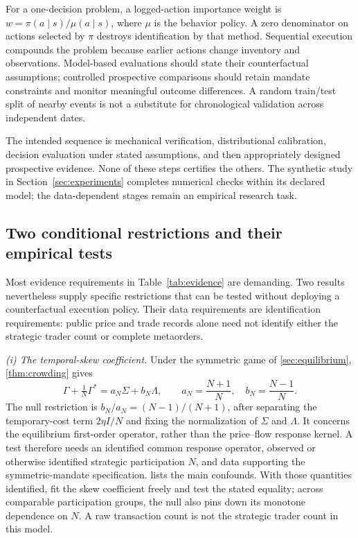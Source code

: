 \documentclass[11pt]{article}
\numberwithin{equation}{section}
\theoremstyle{definition}
\theoremstyle{remark}
\theoremstyle{definition}
\begin{document}
For a one-decision problem, a logged-action importance weight is
$w=\pi(a\mid s)/\mu(a\mid s)$, where $\mu$ is the behavior policy. A zero
denominator on actions selected by $\pi$ destroys identification by that
method. Sequential execution compounds the problem because earlier actions
change inventory and observations. Model-based evaluations should state their
counterfactual assumptions; controlled prospective comparisons should retain
mandate constraints and monitor meaningful outcome differences. A random
train/test split of nearby events is not a substitute for chronological
validation across independent dates.

The intended sequence is mechanical verification, distributional calibration,
decision evaluation under stated assumptions, and then appropriately designed
prospective evidence. None of these steps certifies the others. The synthetic
study in Section~\ref{sec:experiments} completes numerical checks within its
declared model; the data-dependent stages remain an empirical research task.

\subsection{Two conditional restrictions and their empirical tests}
\label{sec:testable}

Most evidence requirements in Table~\ref{tab:evidence} are demanding.
Two results nevertheless supply specific restrictions that can be tested
without deploying a counterfactual execution policy. Their data requirements
are identification requirements: public price and trade records alone need
not identify either the strategic trader count or complete metaorders.

\emph{(i) The temporal-skew coefficient.} Under the symmetric game of
\cref{sec:equilibrium}, \cref{thm:crowding} gives
\[
 \Gamma+\tfrac1N\Gamma^*
 =a_N\Sigma+b_N\Lambda,\qquad
 a_N=\frac{N+1}{N},\quad b_N=\frac{N-1}{N}.
\]
The null restriction is $b_N/a_N=(N-1)/(N+1)$, after separating the
temporary-cost term $2\eta I/N$ and fixing the normalization of $\Sigma$
and $\Lambda$. It concerns the equilibrium first-order operator, rather
than the price--flow response kernel. A test therefore needs an identified
common response operator, observed or otherwise identified strategic
participation $N$, and data supporting the symmetric-mandate specification.
 lists the main confounds. With those quantities
identified, fit the skew coefficient freely and test the stated equality;
across comparable participation groups, the null also pins down its monotone
dependence on $N$. A raw transaction count is not the strategic trader count
in this model.
\end{document}

